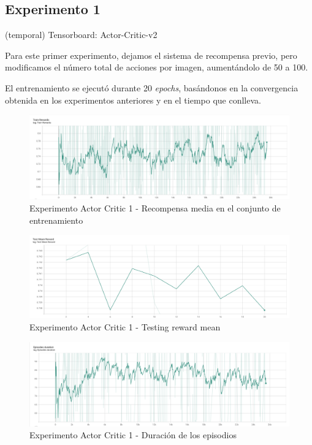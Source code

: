 \subsection{Experimento 1}
\label{resultados-actor-critic-experimento-1}

(temporal) Tensorboard: Actor-Critic-v2

Para este primer experimento, dejamos el sistema de recompensa previo, pero modificamos el número total de acciones por imagen, aumentándolo de 50 a 100.
\medskip

El entrenamiento se ejecutó durante 20 \textit{epochs}, basándonos en la convergencia obtenida en los experimentos anteriores y en el tiempo que conlleva.
\medskip

\begin{figure}[H]
	\centering
	\includegraphics[width=1\textwidth]{figuras/experiments/actor_critic/actor_critic_20_epochs/train_rewards.png}
	\caption[Experimento Actor Critic 1 - Recompensa media en el conjunto de entrenamiento]{Experimento Actor Critic 1 - Recompensa media en el conjunto de entrenamiento}
	\label{fig-experimento-actor-critic-1-training-reward-mean}
\end{figure}
\begin{figure}[H]
	\centering
	\includegraphics[width=1\textwidth]{figuras/experiments/actor_critic/actor_critic_20_epochs/test_mean_reward.png}
	\caption[Experimento Actor Critic 1 - Testing reward mean]{Experimento Actor Critic 1 - Testing reward mean}
	\label{fig-experimento-actor-critic-1-testing-reward-mean}
\end{figure}
\begin{figure}[H]
	\centering
	\includegraphics[width=1\textwidth]{figuras/experiments/actor_critic/actor_critic_20_epochs/episodes_duration.png}
	\caption[Experimento Actor Critic 1 - Duración de los episodios]{Experimento Actor Critic 1 - Duración de los episodios}
	\label{fig-experimento-actor-critic-1-episodes-duration}
\end{figure}
